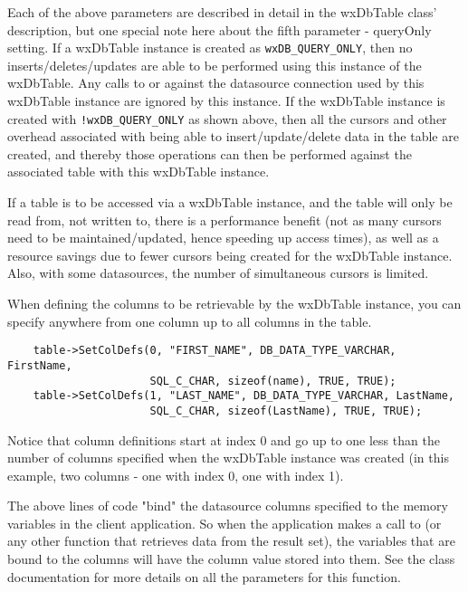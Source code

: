 Each of the above parameters are described in detail in the wxDbTable 
class' description, but one special note here about the fifth 
parameter - queryOnly setting.  If a wxDbTable instance is created as 
{\tt wxDB\_QUERY\_ONLY}, then no inserts/deletes/updates are able to be performed 
using this instance of the wxDbTable.  Any calls to  
or  against the datasource 
connection used by this wxDbTable instance are ignored by this instance.  If 
the wxDbTable instance is created with {\tt !wxDB\_QUERY\_ONLY} as shown above, 
then all the cursors and other overhead associated with being able to 
insert/update/delete data in the table are created, and thereby those 
operations can then be performed against the associated table with this 
wxDbTable instance.

If a table is to be accessed via a wxDbTable instance, and the table will 
only be read from, not written to, there is a performance benefit (not as 
many cursors need to be maintained/updated, hence speeding up access times), 
as well as a resource savings due to fewer cursors being created for the 
wxDbTable instance.  Also, with some datasources, the number of 
simultaneous cursors is limited.  

When defining the columns to be retrievable by the wxDbTable instance, you 
can specify anywhere from one column up to all columns in the table.  

\begin{verbatim}
    table->SetColDefs(0, "FIRST_NAME", DB_DATA_TYPE_VARCHAR, FirstName,
                      SQL_C_CHAR, sizeof(name), TRUE, TRUE);
    table->SetColDefs(1, "LAST_NAME", DB_DATA_TYPE_VARCHAR, LastName,
                      SQL_C_CHAR, sizeof(LastName), TRUE, TRUE);
\end{verbatim}

Notice that column definitions start at index 0 and go up to one less than 
the number of columns specified when the wxDbTable instance was created 
(in this example, two columns - one with index 0, one with index 1).

The above lines of code "bind" the datasource columns specified to the 
memory variables in the client application.  So when the application 
makes a call to  (or any other function that retrieves 
data from the result set), the variables that are bound to the columns will 
have the column value stored into them.  See the 
class documentation for more details on all the parameters for this function.

